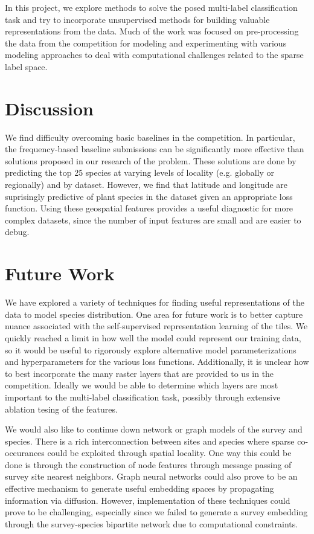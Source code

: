 \documentclass[]{style/ceurart}
\begin{document}
In this project, we explore methods to solve the posed multi-label classification task and try to incorporate unsupervised methods for building valuable representations from the data. 
Much of the work was focused on pre-processing the data from the competition for modeling and experimenting with various modeling approaches to deal with computational challenges related to the sparse label space.




\section{Discussion}

We find difficulty overcoming basic baselines in the competition.
In particular, the frequency-based baseline submissions can be significantly more effective than solutions proposed in our research of the problem.
These solutions are done by predicting the top 25 species at varying levels of locality (e.g. globally or regionally) and by dataset.
However, we find that latitude and longitude are suprisingly predictive of plant species in the dataset given an appropriate loss function.
Using these geospatial features provides a useful diagnostic for more complex datasets, since the number of input features are small and are easier to debug.

\section{Future Work}

We have explored a variety of techniques for finding useful representations of the data to model species distribution.
One area for future work is to better capture nuance associated with the self-supervised representation learning of the tiles.
We quickly reached a limit in how well the model could represent our training data, so it would be useful to rigorously explore alternative model parameterizations and hyperparameters for the various loss functions.
Additionally, it is unclear how to best incorporate the many raster layers that are provided to us in the competition.
Ideally we would be able to determine which layers are most important to the multi-label classification task, possibly through extensive ablation tesing of the features.

We would also like to continue down network or graph models of the survey and species.
There is a rich interconnection between sites and species where sparse co-occurances could be exploited through spatial locality.
One way this could be done is through the construction of node features through message passing of survey site nearest neighbors.
Graph neural networks could also prove to be an effective mechanism to generate useful embedding spaces by propagating information via diffusion.
However, implementation of these techniques could prove to be challenging, especially since we failed to generate a survey embedding through the survey-species bipartite network due to computational constraints.
\end{document}
